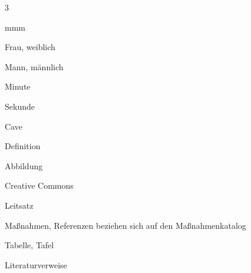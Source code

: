 % 



\begin{WidePar}
\begin{multicols}{3}
{\raggedright\ColumnFontNarrow%

\begin{labeling}{mmm}
  \item[\Female] Frau, weiblich
  \item[\Male] Mann, männlich
  \item[\Min] Minute 
  \item[\Sek] Sekunde  
  
  \item[\Ca{!}] Cave
  \item[\SymbolDefinition] Definition
  \item[\SignFigure] Abbildung
  \item[\libertineGlyph{creativecommons}] Creative Commons
  \item[\SignFazit] Leitsatz
  \item[\SignMassnahme] Maßnahmen, Referenzen beziehen
  sich auf den Maßnahmenkatalog
  \item[\SignTable] Tabelle, Tafel
  \item[\dsliterary] Literaturverweise
\end{labeling}

}
\end{multicols}
\end{WidePar}
